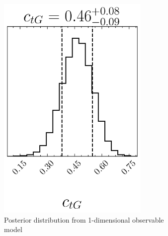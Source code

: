 \documentclass[a4paper,11pt]{article}
\begin{document}
\begin{figure}[H]
    \centering
    \begin{subfigure}[b]{0.4\textwidth}
        \centering
        \includegraphics[width=0.8\textwidth]{plots/ATLAS-ctg_1D_1OP.png}
        \caption{Posterior distribution from 1-dimensional observable model}
    \end{subfigure}
    ~
    \begin{subfigure}[b]{0.4\textwidth}
        \centering

\end{subfigure}
\end{figure}
\end{document}
